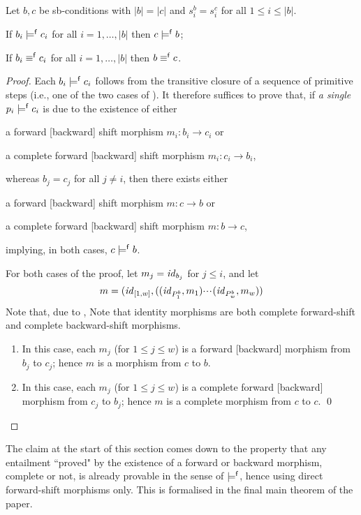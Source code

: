 \begin{proposition}
Let $b,c$ be sb-conditions with $|b|=|c|$ and $s^b_i=s^c_i$ for all $1\leq i\leq |b|$.
\begin{enumerateS}
\item If $b_i\models^{\mathsf f} c_i$ for all $i=1,\ldots,|b|$ then $c\models^{\mathsf f} b$;
\item If $b_i\equiv^{\mathsf f} c_i$ for all $i=1,\ldots,|b|$ then $b\equiv^{\mathsf f} c$.
\end{enumerateS}
\end{proposition}
%
\begin{proof}
Each $b_i\models^{\mathsf f} c_i$ follows from the transitive closure of a sequence of primitive steps (i.e., one of the two cases of ). It therefore suffices to prove that, if \emph{a single} $p_i\models^{\mathsf f} c_i$ is due to the existence of either
\begin{inumerate}
\item a forward [backward] shift morphism $m_i:b_i\to c_i$ or
\item a complete forward [backward] shift morphism $m_i:c_i\to b_i$,
\end{inumerate}
whereas $b_j=c_j$ for all $j\neq i$, then there exists either
\begin{inumerate}
\item a forward [backward] shift morphism $m:c\to b$ or 
\item a complete forward [backward] shift morphism $m:b\to c$,
\end{inumerate}
implying, in both cases, $c\models^{\mathsf f} b$.

\smallskip
For both cases of the proof, let $m_j=\mathit{id}_{b_j}$ for $j\leq i$, and let
%
\[ m = (\mathit{id}_{[1,w]},((\mathit{id}_{P^b_1},m_1){\cdotp\mkern-2mu\cdotp\mkern-2mu\cdotp\mkern1mu} (\mathit{id}_{P^b_w},m_w)) \]
%
\iffull
Note that, due to ,
\else
Note that 
\fi
identity morphisms are both complete forward-shift and complete backward-shift morphisms.
%
\begin{enumerate}[label=\emph{(\roman*)}]
\item In this case, each $m_j$ (for $1\leq j\leq w$) is a forward [backward] morphism from $b_j$ to $c_j$; hence $m$ is a morphism from $c$ to $b$.

\item In this case, each $m_j$ (for $1\leq j\leq w$) is a complete forward [backward] morphism from $c_j$ to $b_j$; hence $m$ is a complete morphism from $c$ to $c$.
\qed
\end{enumerate}
\end{proof}
%
The claim at the start of this section comes down to the property that any entailment ``proved" by the existence of a forward or backward morphism, complete or not, is already provable in the sense of $\models^{\mathsf f}$, hence using direct forward-shift morphisms only. This is formalised in the final main theorem of the paper.

